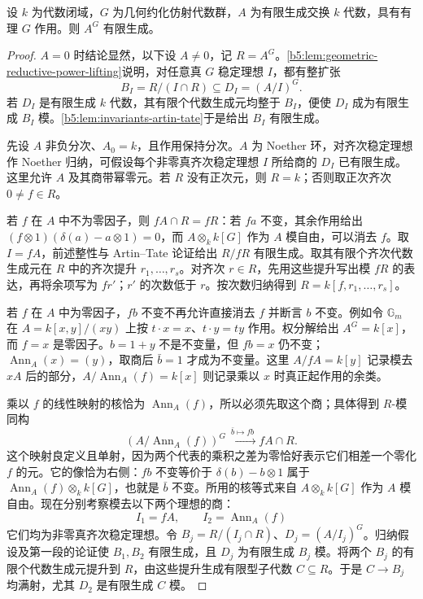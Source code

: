 \begin{theorem}\label{b5:thm:geometric-reductive-finite-generation}
	设 \(k\) 为代数闭域，\(G\) 为几何约化仿射代数群，\(A\) 为有限生成交换 \(k\) 代数，具有有理 \(G\) 作用。则 \(A^G\) 有限生成。
\end{theorem}
\begin{proof}
	\(A=0\) 时结论显然，以下设 \(A\ne0\)，记 \(R=A^G\)。\cref{b5:lem:geometric-reductive-power-lifting}说明，对任意真 \(G\) 稳定理想 \(I\)，都有整扩张
	\[
		B_I=R/(I\cap R)\subseteq D_I=(A/I)^G.
	\]
	若 \(D_I\) 是有限生成 \(k\) 代数，其有限个代数生成元均整于 \(B_I\)，便使 \(D_I\) 成为有限生成 \(B_I\) 模。\cref{b5:lem:invariants-artin-tate}于是给出 \(B_I\) 有限生成。

	先设 \(A\) 非负分次、\(A_0=k\)，且作用保持分次。\(A\) 为 Noether 环，对齐次稳定理想作 Noether 归纳，可假设每个非零真齐次稳定理想 \(I\) 所给商的 \(D_I\) 已有限生成。这里允许 \(A\) 及其商带幂零元。若 \(R\) 没有正次元，则 \(R=k\)；否则取正次齐次 \(0\ne f\in R\)。

	若 \(f\) 在 \(A\) 中不为零因子，则 \(fA\cap R=fR\)：若 \(fa\) 不变，其余作用给出 \((f\otimes1)(\delta(a)-a\otimes1)=0\)，而 \(A\otimes_k k[G]\) 作为 \(A\) 模自由，可以消去 \(f\)。取 \(I=fA\)，前述整性与 Artin--Tate 论证给出 \(R/fR\) 有限生成。取其有限个齐次代数生成元在 \(R\) 中的齐次提升 \(r_1,\ldots,r_s\)。对齐次 \(r\in R\)，先用这些提升写出模 \(fR\) 的表达，再将余项写为 \(fr'\)；\(r'\) 的次数低于 \(r\)。按次数归纳得到 \(R=k[f,r_1,\ldots,r_s]\)。

	若 \(f\) 在 \(A\) 中为零因子，\(fb\) 不变不再允许直接消去 \(f\) 并断言 \(b\) 不变。例如令 \(\mathbb G_m\) 在 \(A=k[x,y]/(xy)\) 上按 \(t\cdot x=x\)、\(t\cdot y=ty\) 作用。权分解给出 \(A^G=k[x]\)，而 \(f=x\) 是零因子。\(b=1+y\) 不是不变量，但 \(fb=x\) 仍不变；\(\operatorname{Ann}_A(x)=(y)\)，取商后 \(\bar b=1\) 才成为不变量。这里 \(A/fA=k[y]\) 记录模去 \(xA\) 后的部分，\(A/\operatorname{Ann}_A(f)=k[x]\) 则记录乘以 \(x\) 时真正起作用的余类。

	乘以 \(f\) 的线性映射的核恰为 \(\operatorname{Ann}_A(f)\)，所以必须先取这个商；具体得到 \(R\)-模同构
	\[
		(A/\operatorname{Ann}_A(f))^G \xrightarrow{\ \bar b\mapsto fb\ } fA\cap R.
	\]
	这个映射良定义且单射，因为两个代表的乘积之差为零恰好表示它们相差一个零化 \(f\) 的元。它的像恰为右侧：\(fb\) 不变等价于 \(\delta(b)-b\otimes1\) 属于 \(\operatorname{Ann}_A(f)\otimes_k k[G]\)，也就是 \(\bar b\) 不变。所用的核等式来自 \(A\otimes_k k[G]\) 作为 \(A\) 模自由。现在分别考察模去以下两个理想的商：
	\[
		I_1=fA,\qquad I_2=\operatorname{Ann}_A(f)
	\]
	它们均为非零真齐次稳定理想。令 \(B_j=R/(I_j\cap R)\)、\(D_j=(A/I_j)^G\)。归纳假设及第一段的论证使 \(B_1,B_2\) 有限生成，且 \(D_j\) 为有限生成 \(B_j\) 模。将两个 \(B_j\) 的有限个代数生成元提升到 \(R\)，由这些提升生成有限型子代数 \(C\subseteq R\)。于是 \(C\to B_j\) 均满射，尤其 \(D_2\) 是有限生成 \(C\) 模。


\end{proof}
